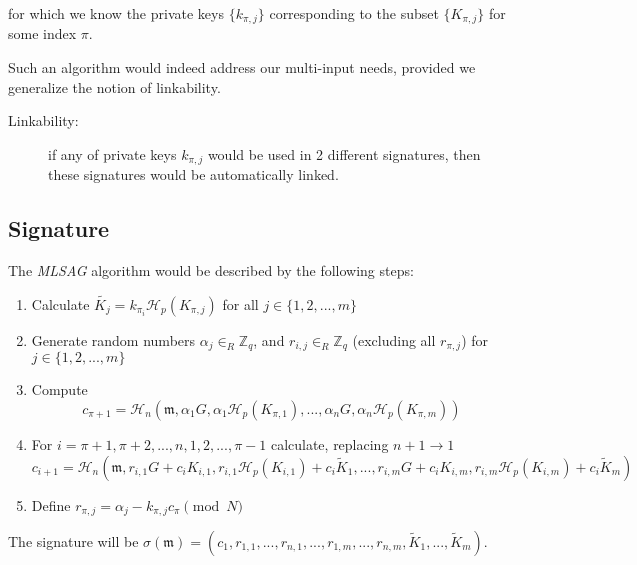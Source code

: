 for which we know
the private keys \(\{k_{\pi, j} \} \) corresponding to the subset \(\{K_{\pi, j}\} \) for some index \(\pi\). 

Such an algorithm would indeed address our multi-input needs, provided we generalize the notion of linkability.

\begin{description}
	\item[Linkability:] if any of private keys \(k_{\pi, j}\) would be used in 2 different signatures, then these signatures would be automatically linked.
\end{description}



\subsection*{Signature}

The {\em MLSAG} algorithm would be described by the following steps:

\begin{enumerate}
	
	\item Calculate \(\tilde{K_j} = k_{\pi_i} \mathcal{H}_p(K_{\pi, j})\) for all \(j \in \{1, 2, ..., m\}\)
	
	\item Generate random numbers  \(\alpha_j \in_R \mathbb{Z}_q\), and \(r_{i, j} \in_R \mathbb{Z}_q\) (excluding all \(r_{\pi, j}\)) for \(j \in \{1, 2, ..., m\}\) 
	
	\item Compute 
	\[
	c_{\pi+1} = \mathcal{H}_n(\mathfrak{m}, \alpha_1 G, \alpha_1 \mathcal{H}_p(K_{\pi, 1}), ..., \alpha_n G, \alpha_n \mathcal{H}_p(K_{\pi, m}))
	\]
	
	\item For \(i = \pi+1, \pi+2, ..., n, 1, 2, ..., \pi-1\) calculate, replacing \(n + 1 \rightarrow 1\)
	\[  c_{i+1} = \mathcal{H}_n(\mathfrak{m}, r_{i, 1} G + c_i K_{i, 1}, r_{i, 1} \mathcal{H}_p(K_{i, 1}) + c_i \tilde{K}_1, 
	..., r_{i, m} G + c_i K_{i, m}, r_{i, m} \mathcal{H}_p(K_{i, m}) + c_i \tilde{K}_m)  \] 
	
	
	\item Define \(r_{\pi, j} = \alpha_j -k_{\pi, j} c_\pi \pmod N\)
	
\end{enumerate}

The signature will be \(\sigma(\mathfrak{m}) = (c_1, r_{1, 1}, ..., r_{n, 1}, ..., r_{1, m}, ..., r_{n, m}, \tilde{K}_1, ...,  \tilde{K}_m) \).

